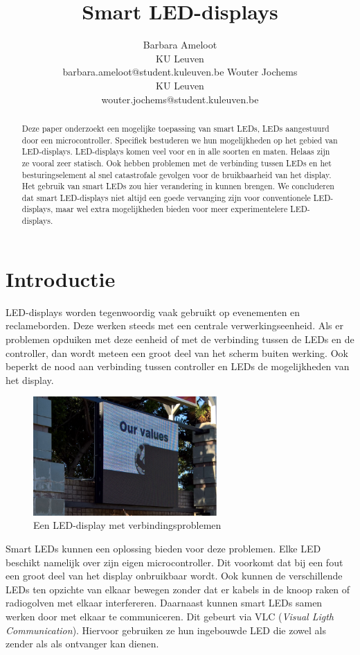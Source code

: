 \documentclass{article}
\title{Smart LED-displays}
\author{Barbara Ameloot\\
KU Leuven\\
barbara.ameloot@student.kuleuven.be
\And 
Wouter Jochems\\
KU Leuven\\
wouter.jochems@student.kuleuven.be}
\begin{document}
\maketitle

\begin{abstract}
Deze paper onderzoekt een mogelijke toepassing van smart LEDs, LEDs aangestuurd door een micro\-controller. Specifiek bestuderen we hun mogelijkheden op het gebied van LED-displays. LED-displays komen veel voor en in alle soorten en maten. Helaas zijn ze vooral zeer statisch. Ook hebben problemen met de verbinding tussen LEDs en het besturingselement al snel catastrofale gevolgen voor de bruikbaarheid van het display. Het gebruik van smart LEDs zou hier verandering in kunnen brengen. We concluderen dat smart LED-displays niet altijd een goede vervanging zijn voor conventionele LED-displays, maar wel extra mogelijkheden bieden voor meer experimentelere LED-displays.
\end{abstract}

\section{Introductie}

LED-displays worden tegenwoordig vaak gebruikt op evenementen en reclameborden. Deze werken steeds met een centrale verwerkingseenheid. Als er problemen opduiken met deze eenheid of met de verbinding tussen de LEDs en de controller, dan wordt meteen een groot deel van het scherm buiten werking. Ook beperkt de nood aan verbinding tussen controller en LEDs de mogelijkheden van het display. 
\begin{figure}[H]
\centering
\includegraphics[width=7cm]{broken.png}
\caption{Een LED-display met verbindingsproblemen}
\end{figure}
Smart LEDs kunnen een oplossing bieden voor deze problemen. Elke LED beschikt namelijk over zijn eigen microcontroller. Dit voorkomt dat bij een fout een groot deel van het display onbruikbaar wordt. Ook kunnen de verschillende LEDs ten opzichte van elkaar bewegen zonder dat er kabels in de knoop raken of radiogolven met elkaar interfereren. Daarnaast kunnen smart LEDs samen werken door met elkaar te communiceren. Dit gebeurt via VLC (\textit{Visual Ligth Communication}). Hiervoor gebruiken ze hun ingebouwde LED die zowel als zender als als ontvanger kan dienen. 
\end{document}
